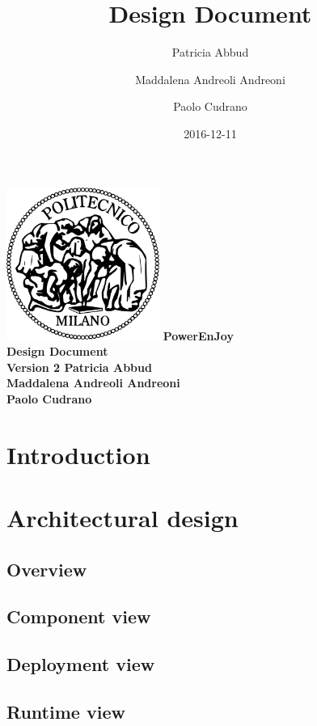 \documentclass[12pt, a4paper]{article}
\title{Design Document}
\date{2016-12-11}
\author{
	Patricia Abbud
	\and
	Maddalena Andreoli Andreoni
	\and
	Paolo Cudrano
}
\begin{document}
	\begin{titlepage}
		\centering
		\includegraphics[width=5cm]{img/polimi_logo.png} %
		\vfill
		{\bfseries\Large
			PowerEnJoy\\
			Design Document\\
			Version 2
			\vskip4cm
			Patricia Abbud\\
			Maddalena Andreoli Andreoni\\
			Paolo Cudrano\\
		}
		\vfill
		\vfill
	\end{titlepage}

	\tableofcontents
	\newpage

	\section{Introduction}
		

	\newpage
	\section{Architectural design}
		\subsection{Overview}
			

		\subsection{Component view}
			

		\subsection{Deployment view}
			

		\subsection{Runtime view}
			
\end{document}
